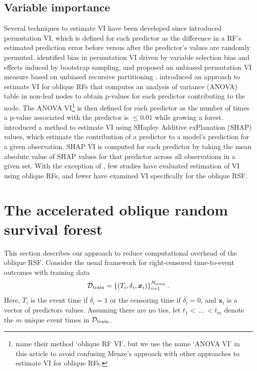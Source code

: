 \documentclass[twoside,11pt]{article}\usepackage[]{graphicx}\usepackage[]{xcolor}
\newcommand{\dataset}{{\cal D}}
\begin{document}
\subsection{Variable importance} \label{sec:rw_vi}

Several techniques to estimate VI have been developed since \citet{breiman2001random} introduced permutation VI, which is defined for each predictor as the difference in a RF's estimated prediction error before versus after the predictor's values are randomly permuted. \citet{strobl2007bias} identified bias in permutation VI driven by variable selection bias and effects induced by bootstrap sampling, and proposed an unbiased permutation VI measure based on unbiased recursive partitioning \citep{hothorn2006unbiased}. \citet{menze2011oblique} introduced an approach to estimate VI for oblique RFs that computes an analysis of variance (ANOVA) table in non-leaf nodes to obtain p-values for each predictor contributing to the node. The ANOVA VI\footnote{\citet{menze2011oblique} name their method `oblique RF VI', but we use the name `ANOVA VI' in this article to avoid confusing Menze's approach with other approaches to estimate VI for oblique RFs.} is then defined for each predictor as the number of times a p-value associated with the predictor is $\leq 0.01$ while growing a forest. \citet{lundberg2017unified} introduced a method to estimate VI using SHapley Additive exPlanation (SHAP) values, which estimate the contribution of a predictor to a model's prediction for a given observation. SHAP VI is computed for each predictor by taking the mean absolute value of SHAP values for that predictor across all observations in a given set. With the exception of \citet{menze2011oblique}, few studies have evaluated estimation of VI using oblique RFs, and fewer have examined VI specifically for the oblique RSF.



\section{The accelerated oblique random survival forest} \label{sec:aorsf}

This section describes our approach to reduce computational overhead of the oblique RSF. Consider the usual framework for right-censored time-to-event outcomes with training data $$\dataset_{\text{train}} = \left\{ (T_i, \delta_i, \bm{x}_{i}) \right\}_{i=1}^{N_{\text{train}}}.$$ Here, $T_i$ is the event time if $\delta_i=1$ or the censoring time if $\delta_i=0$, and $\bm{x}_i$ is a vector of predictors values. Assuming there are no ties, let $t_1 < \, \ldots \, < t_m$ denote the $m$ unique event times in $\dataset_{\text{train}}$.
\end{document}
